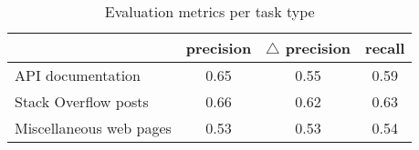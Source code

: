 \begin{table}
\caption{Evaluation metrics per task type}
\label{tbl:comparison-artifact-type-wise}
\centering    
\begin{threeparttable}
\begin{tabular}{lccc}




& \textbf{precision} & $\triangle$ \textbf{precision} & \textbf{recall} \\ 
\hline

API documentation & 0.65 & 0.55 & 0.59
\\

Stack Overflow posts  & 0.66 & 0.62 & 0.63
\\

Miscellaneous web pages & 0.53 & 0.53 & 0.54
\\


\hline
\end{tabular}
\end{threeparttable}
\end{table}
